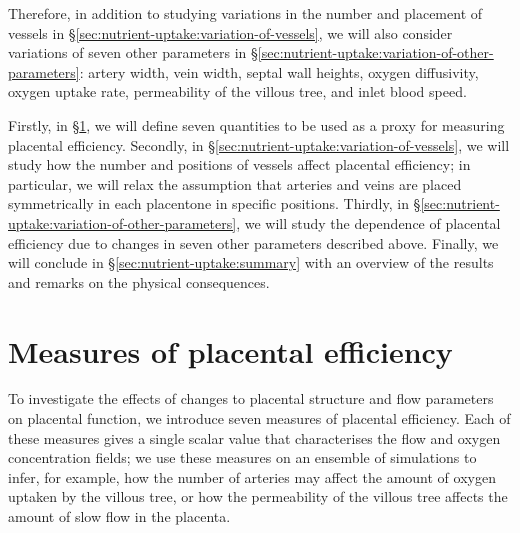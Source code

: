     Therefore, in addition to studying variations in the number and placement of vessels in \S\ref{sec:nutrient-uptake:variation-of-vessels}, we will also consider variations of seven other parameters in \S\ref{sec:nutrient-uptake:variation-of-other-parameters}: artery width, vein width, septal wall heights, oxygen diffusivity, oxygen uptake rate, permeability of the villous tree, and inlet blood speed.
    
    Firstly, in \S\ref{sec:nutrient-uptake:measures-of-efficiency}, we will define seven quantities to be used as a proxy for measuring placental efficiency. Secondly, in \S\ref{sec:nutrient-uptake:variation-of-vessels}, we will study how the number and positions of vessels affect placental efficiency; in particular, we will relax the assumption that arteries and veins are placed symmetrically in each placentone in specific positions. Thirdly, in \S\ref{sec:nutrient-uptake:variation-of-other-parameters}, we will study the dependence of placental efficiency due to changes in seven other parameters described above. Finally, we will conclude in \S\ref{sec:nutrient-uptake:summary} with an overview of the results and remarks on the physical consequences.
    
    \section{Measures of placental efficiency} \label{sec:nutrient-uptake:measures-of-efficiency}
        To investigate the effects of changes to placental structure and flow parameters on placental function, we introduce seven measures of placental efficiency. Each of these measures gives a single scalar value that characterises the flow and oxygen concentration fields; we use these measures on an ensemble of simulations to infer, for example, how the number of arteries may affect the amount of oxygen uptaken by the villous tree, or how the permeability of the villous tree affects the amount of slow flow in the placenta.
        
